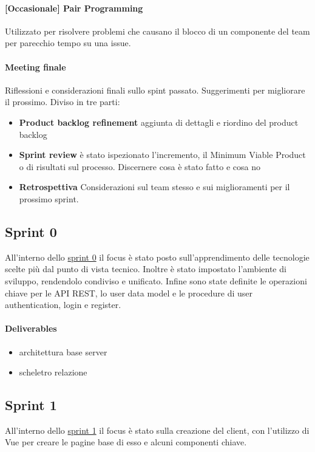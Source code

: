     \paragraph{[Occasionale] Pair Programming } Utilizzato per risolvere problemi che causano il blocco di un componente del team per parecchio tempo su una issue.
    \paragraph{Meeting finale}
        Riflessioni e considerazioni finali sullo spint passato. Suggerimenti per migliorare il prossimo. Diviso in tre parti: 
        \begin{itemize}
        \item\textbf{Product backlog refinement} aggiunta di dettagli e riordino del product backlog
        \item\textbf{Sprint review} è stato ispezionato l'incremento, il Minimum Viable Product o di risultati sul processo. Discernere cosa è stato fatto e cosa no
        \item\textbf{Retrospettiva} Considerazioni sul team stesso e sui miglioramenti per il prossimo sprint. 
        \end{itemize}
        
        

\subsection{Sprint 0}
All'interno dello  \href{https://github.com/orgs/Weather-Vortex/projects/2}{sprint 0} il focus è stato posto sull'apprendimento delle tecnologie scelte più dal punto di vista tecnico. Inoltre è stato impostato l'ambiente di sviluppo, rendendolo condiviso e unificato. 
Infine sono state definite le operazioni chiave per le API REST, lo user data model e le procedure di user authentication, login e register.
\paragraph{Deliverables} 
\begin{itemize}
    \item architettura base server
    \item scheletro relazione
\end{itemize}


\subsection{Sprint 1}
All'interno dello  \href{https://github.com/orgs/Weather-Vortex/projects/3}{sprint 1} il focus è stato sulla creazione del client, con l'utilizzo di Vue per creare le pagine base di esso e alcuni componenti chiave.
